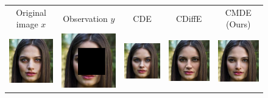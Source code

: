 \begin{figure}
  \begin{center}
      \begingroup
      \setlength{\tabcolsep}{2pt}
  \begin{tabular}{ccccc}
      Original image $x$ & Observation $y$ & CDE & CDiffE & CMDE (Ours) \\

      \includegraphics[width=.15\textwidth]{Chapter2/samples/inpainting/table/1/x.png} &   
      \includegraphics[width=.15\textwidth]{Chapter2/samples/inpainting/table/1/y.png} &
      \includegraphics[width=.15\textwidth]{Chapter2/samples/inpainting/table/1/sr3.png} & 
      \includegraphics[width=.15\textwidth]{Chapter2/samples/inpainting/table/1/Song.png} & 
      \includegraphics[width=.15\textwidth]{Chapter2/samples/inpainting/table/1/DV.png} \\


\end{tabular}
\end{center}
\end{figure}
